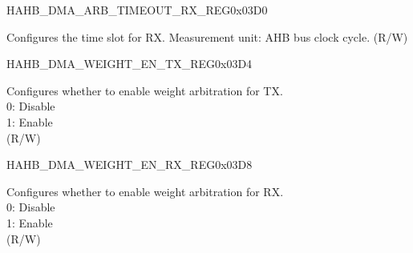 {    \begin{register}{H}{AHB\_DMA\_ARB\_TIMEOUT\_RX\_REG}{0x03D0}\label{regdesc:AHBDMAARBTIMEOUTRXREG}
    \regnewline%
    \begin{regdesc}\begin{reglist}
    \label{fielddesc:AHBDMAARBTIMEOUTRX}\item [AHB\_DMA\_ARB\_TIMEOUT\_RX] Configures the time slot for RX. Measurement unit: AHB bus clock cycle. (R/W)
    \end{reglist}\end{regdesc}
    \end{register}


    \begin{register}{H}{AHB\_DMA\_WEIGHT\_EN\_TX\_REG}{0x03D4}\label{regdesc:AHBDMAWEIGHTENTXREG}
    \regnewline%
    \begin{regdesc}\begin{reglist}
    \label{fielddesc:AHBDMAWEIGHTENTX}\item [AHB\_DMA\_WEIGHT\_EN\_TX] Configures whether to enable weight arbitration for TX.\\
    0: Disable\\
    1: Enable\\ (R/W)
    \end{reglist}\end{regdesc}
    \end{register}


    \begin{register}{H}{AHB\_DMA\_WEIGHT\_EN\_RX\_REG}{0x03D8}\label{regdesc:AHBDMAWEIGHTENRXREG}
    \regnewline%
    \begin{regdesc}\begin{reglist}
    \label{fielddesc:AHBDMAWEIGHTENRX}\item [AHB\_DMA\_WEIGHT\_EN\_RX] Configures whether to enable weight arbitration for RX.\\
    0: Disable\\
    1: Enable\\ (R/W)
    \end{reglist}\end{regdesc}
    \end{register}
}


